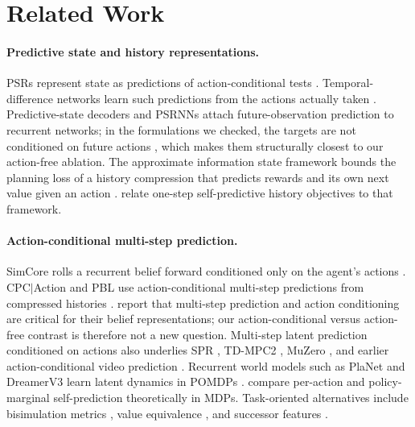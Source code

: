 \section{Related Work}
\label{sec:related}

\paragraph{Predictive state and history representations.}
PSRs represent state as predictions of action-conditional tests \citep{littman2001psr,singh2004psr}. Temporal-difference networks learn such predictions from the actions actually taken \citep{sutton2004tdnets}. Predictive-state decoders and PSRNNs attach future-observation prediction to recurrent networks; in the formulations we checked, the targets are not conditioned on future actions \citep{venkatraman2017psd,downey2017psrnn}, which makes them structurally closest to our action-free ablation. The approximate information state framework bounds the planning loss of a history compression that predicts rewards and its own next value given an action \citep{subramanian2022ais}. \citet{ni2024bridging} relate one-step self-predictive history objectives to that framework.

\paragraph{Action-conditional multi-step prediction.}
SimCore rolls a recurrent belief forward conditioned only on the agent's actions \citep{gregor2019simcore}. CPC$|$Action and PBL use action-conditional multi-step predictions from compressed histories \citep{guo2018belief,guo2020pbl}. \citet{guo2018belief} report that multi-step prediction and action conditioning are critical for their belief representations; our action-conditional versus action-free contrast is therefore not a new question. Multi-step latent prediction conditioned on actions also underlies SPR \citep{schwarzer2021spr}, TD-MPC2 \citep{hansen2024tdmpc2}, MuZero \citep{schrittwieser2020muzero}, and earlier action-conditional video prediction \citep{oh2015action}. Recurrent world models such as PlaNet and DreamerV3 learn latent dynamics in POMDPs \citep{hafner2019planet,hafner2023dreamerv3}. \citet{khetarpal2025unifying} compare per-action and policy-marginal self-prediction theoretically in MDPs. Task-oriented alternatives include bisimulation metrics \citep{zhang2021dbc}, value equivalence \citep{grimm2020ve}, and successor features \citep{dayan1993sr,barreto2017sf}.

